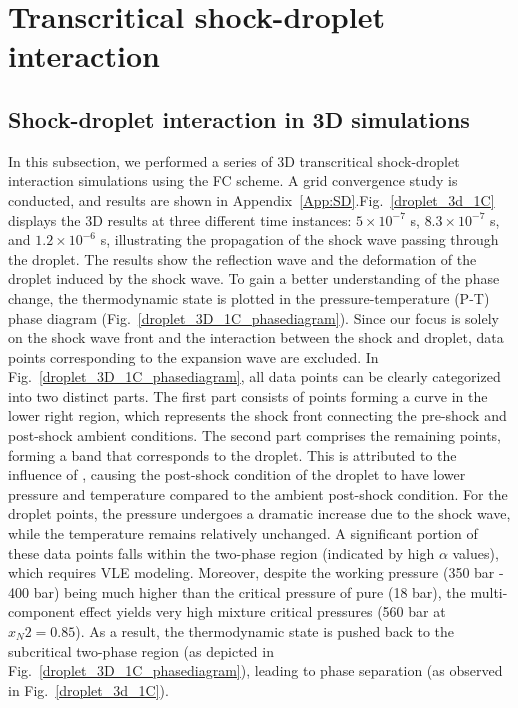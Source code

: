 \section{Transcritical shock-droplet interaction}
\subsection{Shock-droplet interaction in 3D simulations}
\label{sec:SD_3D}

In this subsection, we performed a series of 3D transcritical shock-droplet interaction simulations using the FC scheme. A grid convergence study is conducted, and results are shown in Appendix~\ref{App:SD}.Fig.~\ref{droplet_3d_1C} displays the 3D results at three different time instances: $5\times 10^{-7}$ s, $8.3\times 10^{-7}$ s, and $1.2\times 10^{-6}$ s, illustrating the propagation of the shock wave passing through the droplet. The results show the reflection wave and the deformation of the droplet induced by the shock wave. To gain a better understanding of the phase change, the thermodynamic state is plotted in the pressure-temperature (P-T) phase diagram (Fig.~\ref{droplet_3D_1C_phasediagram}). Since our focus is solely on the shock wave front and the interaction between the shock and droplet, data points corresponding to the expansion wave are excluded. In Fig.~\ref{droplet_3D_1C_phasediagram}, all data points can be clearly categorized into two distinct parts. The first part consists of points forming a curve in the lower right region, which represents the shock front connecting the pre-shock and post-shock ambient conditions. The second part comprises the remaining points, forming a band that corresponds to the droplet. This is attributed to the influence of , causing the post-shock condition of the droplet to have lower pressure and temperature compared to the ambient post-shock condition. For the droplet points, the pressure undergoes a dramatic increase due to the shock wave, while the temperature remains relatively unchanged. A significant portion of these data points falls within the two-phase region (indicated by high $\alpha$ values), which requires VLE modeling. Moreover, despite the working pressure (350 bar - 400 bar) being much higher than the critical pressure of pure  (18 bar), the multi-component effect yields very high mixture critical pressures (560 bar at $x_N2 = 0.85$). As a result, the thermodynamic state is pushed back to the subcritical two-phase region (as depicted in Fig.~\ref{droplet_3D_1C_phasediagram}), leading to phase separation (as observed in Fig.~\ref{droplet_3d_1C}).

